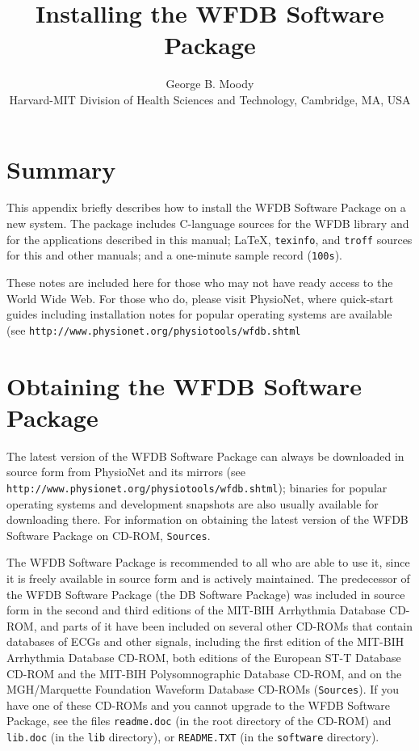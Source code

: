 \documentclass[twoside]{article}
\title{Installing the WFDB Software Package}
\author{George B. Moody\\
Harvard-MIT Division of Health Sciences and Technology, Cambridge, MA, USA}
\date{}
\begin{document}
\setcounter{page}{109}

\maketitle

\section*{Summary}
This appendix briefly describes how to install the WFDB Software Package on a
new system.  The package includes C-language sources for the WFDB library and
for the applications described in this manual; \LaTeX{}, {\tt texinfo}, and
{\tt troff} sources for this and other manuals; and a one-minute sample record
({\tt 100s}).

These notes are included here for those who may not have ready access to the
World Wide Web.  For those who do, please visit PhysioNet, where quick-start
guides including installation notes for popular operating systems are available
(see {\tt http://www.physio\-net.org/physio\-tools/wfdb.shtml}

\section*{Obtaining the WFDB Software Package}
The latest version of the WFDB Software Package can always be downloaded in
source form from PhysioNet and its mirrors (see
{\tt http://www.physio\-net.org/physio\-tools/wfdb.shtml}); binaries for
popular operating systems and development snapshots are also usually available
for downloading there.  For information on obtaining the latest version of the
WFDB Software Package on CD-ROM, {\tt Sources}.

The WFDB Software Package is recommended to all who are able to use it, since
it is freely available in source form and is actively maintained.  The
predecessor of the WFDB Software Package (the DB Software Package) was included
in source form in the second and third editions of the MIT-BIH Arrhythmia
Database CD-ROM, and parts of it have been included on several other CD-ROMs
that contain databases of ECGs and other signals, including the first edition
of the MIT-BIH Arrhythmia Database CD-ROM, both editions of the European ST-T
Database CD-ROM and the MIT-BIH Polysomnographic Database CD-ROM, and on the
MGH/Marquette Foundation Waveform Database CD-ROMs ({\tt Sources}).  If you
have one of these CD-ROMs and you cannot upgrade to the WFDB Software Package,
see the files {\tt readme.doc} (in the root directory of the CD-ROM) and
{\tt lib.doc} (in the {\tt lib} directory), or {\tt README.TXT} (in the
{\tt software} directory).
\end{document}
